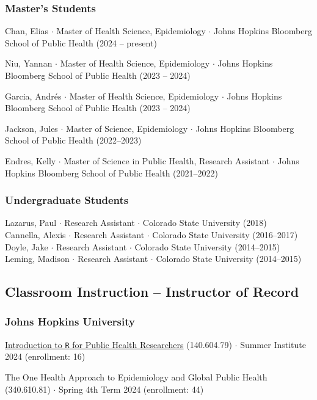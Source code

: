 \documentclass{cv}
\begin{document}
\subsubsection*{Master's Students}

Chan, Elias $\cdot$ Master of Health Science, Epidemiology $\cdot$ Johns Hopkins Bloomberg School of Public Health (2024 -- present)

Niu, Yannan $\cdot$ Master of Health Science, Epidemiology $\cdot$ Johns Hopkins Bloomberg School of Public Health (2023 -- 2024)

Garcia, Andrés $\cdot$ Master of Health Science, Epidemiology $\cdot$ Johns Hopkins Bloomberg School of Public Health (2023 -- 2024)

Jackson, Jules $\cdot$ Master of Science, Epidemiology $\cdot$ Johns Hopkins Bloomberg School of Public Health (2022--2023)

Endres, Kelly $\cdot$ Master of Science in Public Health, Research Assistant $\cdot$ Johns Hopkins Bloomberg School of Public Health (2021--2022)

\subsubsection*{Undergraduate Students}

Lazarus, Paul $\cdot$ Research Assistant $\cdot$ Colorado State University (2018) \\
Cannella, Alexis $\cdot$ Research Assistant $\cdot$ Colorado State University (2016--2017) \\
Doyle, Jake $\cdot$ Research Assistant $\cdot$ Colorado State University (2014--2015) \\
Leming, Madison $\cdot$ Research Assistant $\cdot$ Colorado State University (2014--2015)

\subsection*{Classroom Instruction -- Instructor of Record}

\subsubsection*{Johns Hopkins University}

\href{https://jhudatascience.org/intro_to_r/}{Introduction to \texttt{R} for Public Health Researchers} (140.604.79) $\cdot$ Summer Institute 2024 (enrollment: 16)

The One Health Approach to Epidemiology and Global Public Health (340.610.81) $\cdot$ Spring 4th Term 2024 (enrollment: 44)
\end{document}
